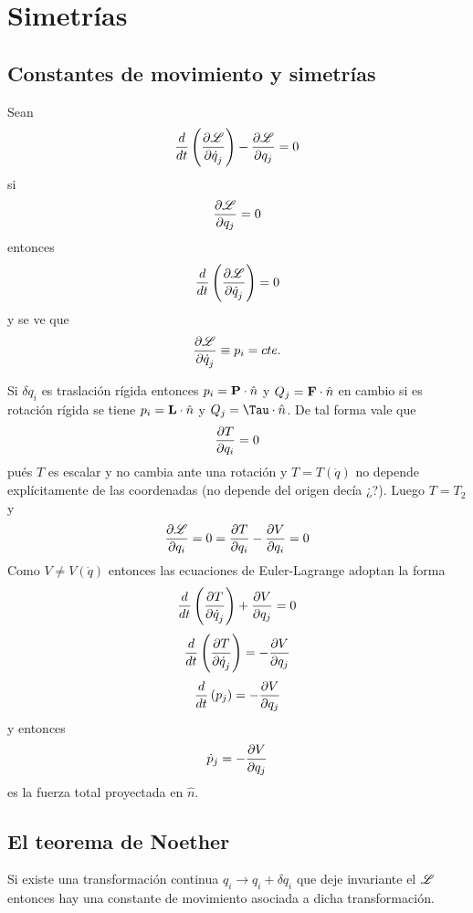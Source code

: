 \documentclass[10pt,oneside]{CBFT_book}
\begin{document}
\chapter{Simetrías}

\section{Constantes de movimiento y simetrías}

Sean 
\[
	\frac{d}{dt}\left( \dpar{\Lag}{\dot{q}_j} \right) - \dpar{\Lag}{q_j}  = 0 
\]
si
\[
	\dpar{\Lag}{q_j}  = 0 
\]
entonces 
\[
	\frac{d}{dt}\left( \dpar{\Lag}{\dot{q}_j} \right) = 0
\]
y se ve que 
\[
	\dpar{\Lag}{\dot{q}_j} \equiv p_i = cte.
\]

Si $\delta q_i$ es traslación rígida entonces $p_i = \vb{P}\cdot\hat{n}$ y $Q_j= \vb{F}\cdot\hat{n}$ en
cambio si es rotación rígida se tiene $p_i = \vb{L}\cdot\hat{n}$ y $Q_j= \vb{\Tau}\cdot\hat{n}$.
De tal forma vale que 
\[
	\dpar{T}{q_i} = 0
\]
pués $T$ es escalar y no cambia ante una rotación y $T=T(\dot{q})$ no depende explícitamente de las
coordenadas (no depende del origen decía ¿?). Luego $T=T_2$ y
\[
	\dpar{\Lag}{q_i} = 0 = \dpar{T}{q_i} - \dpar{V}{q_i} = 0
\]
Como $V \neq V(\dot{q})$ entonces las ecuaciones de Euler-Lagrange adoptan la forma
\[
	\frac{d}{dt}\left( \dpar{T}{\dot{q}_j} \right) + \dpar{V}{q_j}  = 0 
\]
\[
	\frac{d}{dt}\left( \dpar{T}{\dot{q}_j} \right) = - \dpar{V}{q_j}   
\]
\[
	\frac{d}{dt}\left( p_j \right) = - \dpar{V}{q_j}   
\]
y entonces 
\[
	\dot{p}_j = -\dpar{V}{q_j}   
\]
es la fuerza total proyectada en $\hat{n}$.

\section{El teorema de Noether}

Si existe una transformación continua $q_i \longrightarrow q_i + \delta q_i$ que deje invariante el
$\Lag$ entonces hay una constante de movimiento asociada a dicha transformación.
\end{document}
